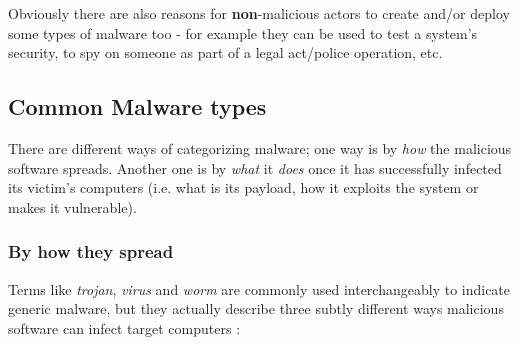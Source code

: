 \documentclass[pdfa%
,cucitura%
]{toptesi}
\begin{document}
Obviously there are also reasons for \textbf{non}-malicious actors to create and/or deploy some types of malware too - for example they can be used to test a system's security, to spy on someone as part of a legal act/police operation, etc.

\subsection{Common Malware types}
There are different ways of categorizing malware; one way is by \textit{how} the malicious software spreads. Another one is by \textit{what} it \textit{does} once it has successfully infected its victim's computers (i.e. what is its payload, how it exploits the system or makes it vulnerable).

\subsubsection{By how they spread}
Terms like \textit{trojan}, \textit{virus} and \textit{worm} are commonly used interchangeably to indicate generic malware, but they actually describe three subtly different ways malicious software can infect target computers \cite{SymantecDVWT}:
\end{document}

